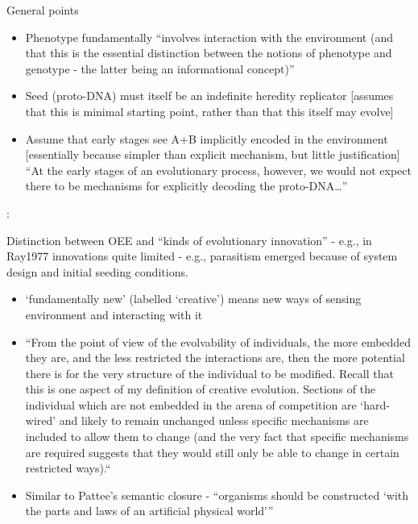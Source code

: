 General points

\begin{itemize}
	
	\item
	
	Phenotype fundamentally ``involves interaction with the environment
	(and that this is the essential distinction between the notions of
	phenotype and genotype - the latter being an informational
	concept)''
	
	\item
	
	Seed (proto-DNA) must itself be an indefinite heredity replicator
	{[}assumes that this is minimal starting point, rather than that
	this itself may evolve{]}
	
	\item
	
	Assume that early stages see A+B implicitly encoded in the
	environment {[}essentially because simpler than explicit mechanism,
	but little justification{]} ``At the early stages of an evolutionary
	process, however, we would not expect there to be mechanisms for
	explicitly decoding the proto-DNA\ldots{}''
	
\end{itemize}


\autocite{Taylor2001}:

Distinction between OEE and ``kinds of evolutionary innovation'' -
e.g., in Ray1977 innovations quite limited - e.g., parasitism emerged
because of system design and initial seeding conditions.

\begin{itemize}
	\item
	
	`fundamentally new' (labelled `creative') means new ways of sensing
	environment and interacting with it
	
	\item
	
	``From the point of view of the evolvability of individuals, the
	more embedded they are, and the less restricted the interactions
	are, then the more potential there is for the very structure of the
	individual to be modified. Recall that this is one aspect of my
	definition of creative evolution. Sections of the individual which
	are not embedded in the arena of competition are `hard-wired' and
	likely to remain unchanged unless specific mechanisms are included
	to allow them to change (and the very fact that specific mechanisms
	are required suggests that they would still only be able to change
	in certain restricted ways).``
	
	\item
	
	Similar to Pattee's semantic closure - ``organisms should be
	constructed `with the parts and laws of an artificial physical
	world'''
	
\end{itemize}

